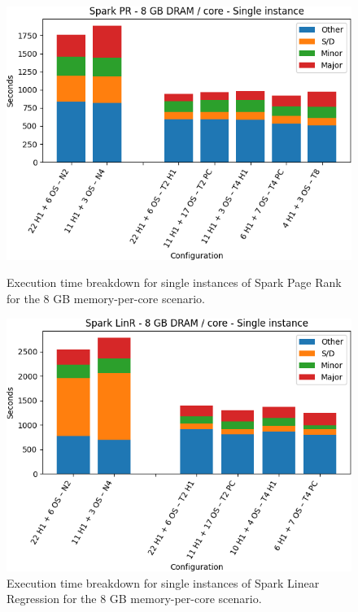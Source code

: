 \begin{figure}[thbp]
\centering
    \includegraphics[width=\linewidth]{./fig/pr64_single.png}
    \caption{ Execution time breakdown for single instances of Spark
	Page Rank for the 8 GB memory-per-core scenario.}
    \label{fig:pr64_single}
	\includegraphics[width=\linewidth]{./fig/linr64_single.png}
    \caption{Execution time breakdown for single instances of Spark
	Linear Regression for the 8 GB memory-per-core scenario.}
    \label{fig:linr64_single}
\end{figure}


